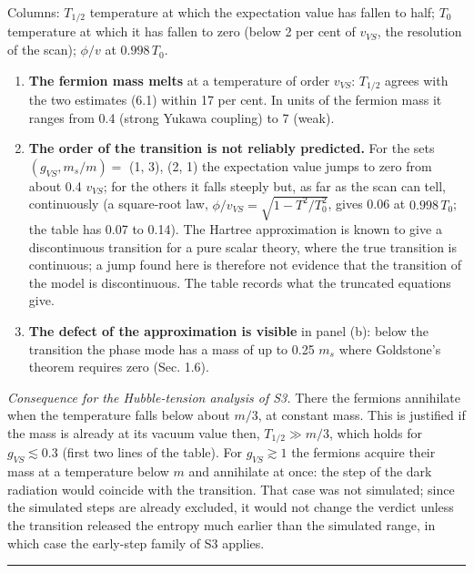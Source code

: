 \documentclass[
  10pt,
]{article}
\providecommand{\tightlist}{%
  \setlength{\itemsep}{0pt}\setlength{\parskip}{0pt}}
\begin{document}
Columns: \(T_{1/2}\) temperature at which the expectation value has
fallen to half; \(T_0\) temperature at which it has fallen to zero
(below 2 per cent of \(v_{VS}\), the resolution of the scan); \(\phi/v\)
at \(0.998\,T_0\).

\begin{enumerate}
\def\labelenumi{\arabic{enumi}.}
\tightlist
\item
  \textbf{The fermion mass melts} at a temperature of order \(v_{VS}\):
  \(T_{1/2}\) agrees with the two estimates (6.1) within 17 per cent. In
  units of the fermion mass it ranges from 0.4 (strong Yukawa coupling)
  to 7 (weak).
\item
  \textbf{The order of the transition is not reliably predicted.} For
  the sets \((g_{VS},m_s/m)=\) (1, 3), (2, 1) the expectation value
  jumps to zero from about 0.4 \(v_{VS}\); for the others it falls
  steeply but, as far as the scan can tell, continuously (a square-root
  law, \(\phi/v_{VS}=\sqrt{1-T^2/T_0^2}\), gives 0.06 at \(0.998\,T_0\);
  the table has 0.07 to 0.14). The Hartree approximation is known to
  give a discontinuous transition for a pure scalar theory, where the
  true transition is continuous; a jump found here is therefore not
  evidence that the transition of the model is discontinuous. The table
  records what the truncated equations give.
\item
  \textbf{The defect of the approximation is visible} in panel (b):
  below the transition the phase mode has a mass of up to 0.25 \(m_s\)
  where Goldstone's theorem requires zero (Sec. 1.6).
\end{enumerate}

\emph{Consequence for the Hubble-tension analysis of S3.} There the
fermions annihilate when the temperature falls below about \(m/3\), at
constant mass. This is justified if the mass is already at its vacuum
value then, \(T_{1/2}\gg m/3\), which holds for \(g_{VS}\lesssim0.3\)
(first two lines of the table). For \(g_{VS}\gtrsim1\) the fermions
acquire their mass at a temperature below \(m\) and annihilate at once:
the step of the dark radiation would coincide with the transition. That
case was not simulated; since the simulated steps are already excluded,
it would not change the verdict unless the transition released the
entropy much earlier than the simulated range, in which case the
early-step family of S3 applies.

\begin{center}\rule{0.5\linewidth}{0.5pt}\end{center}
\end{document}

